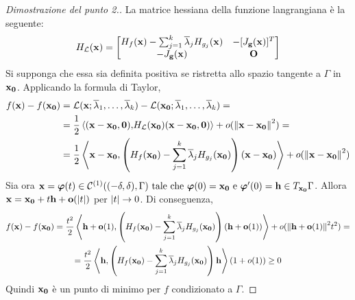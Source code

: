 \begin{proof}
    [Dimostrazione del punto 2.]
    La matrice hessiana della funzione langrangiana è la seguente:
    $$
        H_{\mathcal{L}}(\vb{x})=
        \begin{bmatrix}
            H_f(\vb{x})-\sum_{j=1}^k\overline{\lambda}_j H_{g_j}(\vb{x})
            & -[J_{\vb{g}}(\vb{x})]^T\\
            -J_{\vb{g}}(\vb{x}) & \vb{O}
        \end{bmatrix}
    $$
    Si supponga che essa sia definita positiva se ristretta allo spazio tangente a $\Gamma$ in $\vb{x_0}$.
    Applicando la formula di Taylor,
    \begin{align*}
        f(\vb{x})-f(\vb{x_0})&=\mathcal{L}(\vb{x};\overline{\lambda}_1,\dots,\overline{\lambda}_k)-\mathcal{L}(\vb{x_0};\overline{\lambda}_1,\dots,\overline{\lambda}_k)=\\
        &=\frac{1}{2}\left\langle(\vb{x}-\vb{x_0},\vb{0}){,}H_{\mathcal{L}}(\vb{x_0})(\vb{x}-\vb{x_0},\vb{0})\right\rangle+o(\norm{\vb{x}-\vb{x_0}}^2)=\\
        &=\frac{1}{2}\left\langle\vb{x}-\vb{x_0}{,}\left( H_f(\vb{x_0})-\sum_{j=1}^k\overline{\lambda}_j H_{g_j}(\vb{x_0}) \right)(\vb{x}-\vb{x_0})\right\rangle+o(\norm{\vb{x}-\vb{x_0}}^2)
    \end{align*}
    Sia ora $\vb{x}=\bm\varphi(t)\in \mathcal{C}^{(1)}((-\delta,\delta),\Gamma) \text{ tale che } \bm\varphi(0)=\vb{x_0} \text{ e } \bm\varphi'(0)=\vb{h} \in T_{\vb{x_0}}\Gamma$. Allora $\vb{x}=\vb{x_0}+t\vb{h}+\vb{o}(\abs{t})$ per $\abs{t}\to 0$. Di conseguenza,
    \begin{gather*}
        f(\vb{x})-f(\vb{x_0})=\frac{t^2}{2}\left\langle\vb{h}+\vb{o}(1){,}\left( H_f(\vb{x_0})-\sum_{j=1}^k\overline{\lambda}_j H_{g_j}(\vb{x_0}) \right)(\vb{h}+\vb{o}(1))\right\rangle+o(\norm{\vb{h}+\vb{o}(1)}^2t^2)=\\
        =\frac{t^2}{2}\left\langle\vb{h}{,}\left( H_f(\vb{x_0})-\sum_{j=1}^k\overline{\lambda}_j H_{g_j}(\vb{x_0}) \right)\vb{h}\right\rangle(1+o(1))\geq 0
    \end{gather*}
    Quindi $\vb{x_0}$ è un punto di minimo per $f$ condizionato a $\Gamma$.
\end{proof}